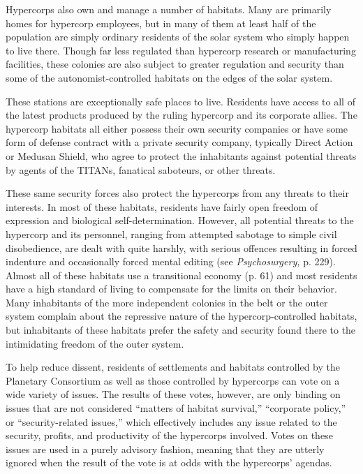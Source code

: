 Hypercorps also own and manage a number of 
habitats. Many are primarily homes for hypercorp 
employees, but in many of them at least half of the 
population are simply ordinary residents of the solar 
system who simply happen to live there. Though far 
less regulated than hypercorp research or manufacturing facilities, these colonies are also subject to 
greater regulation and security than some of the 
autonomist-controlled habitats on the edges of the 
solar system. 

These stations are exceptionally safe places to live. 
Residents have access to all of the latest products 
produced by the ruling hypercorp and its corporate 
allies. The hypercorp habitats all either possess 
their own security companies or have some form 
of defense contract with a private security company, 
typically Direct Action or Medusan Shield, who 
agree to protect the inhabitants against potential 
threats by agents of the TITANs, fanatical saboteurs, 
or other threats.

These same security forces also protect the hypercorps from any threats to their interests. In most of 
these habitats, residents have fairly open freedom 
of expression and biological self-determination. 
However, all potential threats to the hypercorp and 
its personnel, ranging from attempted sabotage 
to simple civil disobedience, are dealt with quite 
harshly, with serious offences resulting in forced indenture and occasionally forced mental editing (see 
\textit{Psychosurgery, }p. 229). Almost all of these habitats 
use a transitional economy (p. 61) and most residents 
have a high standard of living to compensate for the 
limits on their behavior. Many inhabitants of the 
more independent colonies in the belt or the outer 
system complain about the repressive nature of the 
hypercorp-controlled habitats, but inhabitants of 
these habitats prefer the safety and security found 
there to the intimidating freedom of the outer system.

To help reduce dissent, residents of settlements and 
habitats controlled by the Planetary Consortium as 
well as those controlled by hypercorps can vote on 
a wide variety of issues. The results of these votes, 
however, are only binding on issues that are not 
considered ``matters of habitat survival,'' ``corporate 
policy,'' or ``security-related issues,'' which effectively 
includes any issue related to the security, profits, and 
productivity of the hypercorps involved. Votes on 
these issues are used in a purely advisory fashion, 
meaning that they are utterly ignored when the result 
of the vote is at odds with the hypercorps' agendas.

